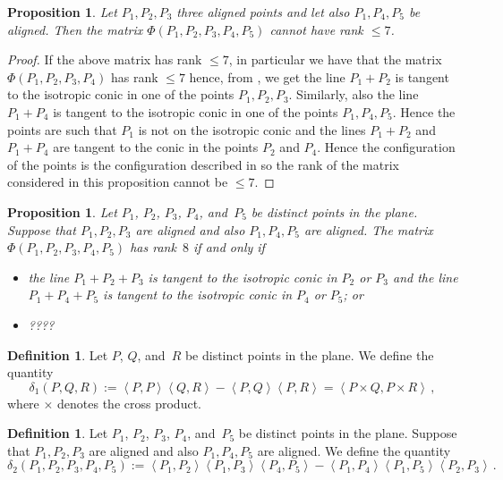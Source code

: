 \documentclass[12pt, a4paper, reqno, captions=tableheading,bibliography=totoc]{scrartcl}
\theoremstyle{plain}
\newtheorem{prop}[lemma]{Proposition}
\theoremstyle{definition}
\newtheorem{definition}[lemma]{Definition}
\newcommand{\scl}[2]{\left\langle {#1}, {#2} \right\rangle}
\begin{document}
\begin{prop}
  Let $P_1, P_2, P_3$ three aligned points and let also $P_1, P_4, P_5$
  be aligned. Then the matrix $\Phi(P_1, P_2, P_3, P_4, P_5)$ cannot
  have rank $\leq 7$.
\end{prop}
\begin{proof}
  If the above matrix has rank $\leq 7$, in particular we have that
  the matrix $\Phi(P_1, P_2, P_3, P_4)$ has rank $\leq 7$ hence, from
  , we get the line $P_1+P_2$ is
  tangent to the isotropic conic in one of the points $P_1, P_2, P_3$.
  Similarly, also the line $P_1+P_4$ is tangent to the isotropic conic
  in one of the points $P_1, P_4, P_5$. Hence the points are such that
  $P_1$ is not on the isotropic conic and the lines $P_1+P_2$ and
  $P_1+P_4$ are tangent to the conic in the points $P_2$ and $P_4$.
  Hence the configuration of the points is the configuration described
  in  so the rank of the matrix
  considered in this proposition cannot be $\leq 7$.
\end{proof}


\begin{prop}
 Let $P_1$, $P_2$, $P_3$, $P_4$, and~$P_5$ be distinct points in the plane.
 Suppose that $P_1, P_2, P_3$ are aligned and also $P_1, P_4, P_5$ are aligned.
 The matrix $\Phi(P_1, P_2, P_3, P_4, P_5)$ has rank~$8$ if and only if
 \begin{itemize}
  \item the line $P_1 + P_2 + P_3$ is tangent to the isotropic conic in $P_2$ or $P_3$ and the line $P_1 + P_4 + P_5$ is tangent to the isotropic conic in $P_4$ or $P_5$; or
  \item ????
 \end{itemize}
\end{prop}


\begin{definition}
\label{definition:delta1}
 Let $P$, $Q$, and~$R$ be distinct points in the plane.
 We define the quantity
 \[
  \delta_1(P, Q, R) :=
  \scl{P}{P} \scl{Q}{R} - \scl{P}{Q}\scl{P}{R}
  =
  \scl{P\times Q}{P \times R} \,,
 \]
 where $\times$ denotes the cross product.
\end{definition}

\begin{definition}
 Let $P_1$, $P_2$, $P_3$, $P_4$, and~$P_5$ be distinct points in the plane.
 Suppose that $P_1, P_2, P_3$ are aligned and also $P_1, P_4, P_5$ are aligned.
 We define the quantity
 \[
  \delta_2(P_1, P_2, P_3, P_4, P_5) :=
  \scl{P_1}{P_2} \scl{P_1}{P_3} \scl{P_4}{P_5} -
  \scl{P_1}{P_4} \scl{P_1}{P_5} \scl{P_2}{P_3} \,.
 \]
\end{definition}
\end{document}
